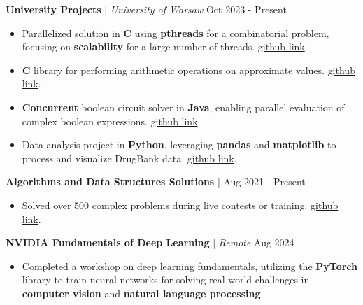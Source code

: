 \documentclass{article}
\renewcommand{\subsection}[3]{
    \noindent\textbf{#1} | \emph{#2} \hfill #3
}
\begin{document}
    \subsection{University Projects}{University of Warsaw}{Oct 2023 - Present}
    \begin{itemize}
        \item Parallelized solution in \textbf{C} using \textbf{pthreads} for a combinatorial problem, focusing on \textbf{scalability} for a large number of threads. \href{https://github.com/mrolbiecki/university-projects/tree/main/concurrent-programming/parallel-combinatorics}{github link}.
        \item \textbf{C} library for performing arithmetic operations on approximate values. \href{https://github.com/mrolbiecki/university-projects/tree/main/introductory-programming/arithmetic-of-approximate-values}{github link}.
        \item \textbf{Concurrent} boolean circuit solver in \textbf{Java}, enabling parallel evaluation of complex boolean expressions. \href{https://github.com/mrolbiecki/university-projects/tree/main/concurrent-programming/circuit-solver}{github link}.
        \item Data analysis project in \textbf{Python}, leveraging \textbf{pandas} and \textbf{matplotlib} to process and visualize DrugBank data. \href{https://github.com/mrolbiecki/university-projects/tree/main/python-course/data-analysis}{github link}.
    \end{itemize}
    \vspace{0.5em}

    \subsection{Algorithms and Data Structures Solutions}{}{Aug 2021 - Present}
    \begin{itemize}
        \item Solved over 500 complex problems during live contests or training. \href{https://github.com/mrolbiecki/competitive-programming-solutions}{github link}.
    \end{itemize}
    \vspace{0.5em}
    
    \subsection{NVIDIA Fundamentals of Deep Learning}{Remote}{Aug 2024}
    \begin{itemize}
        \item Completed a workshop on deep learning fundamentals, utilizing the \textbf{PyTorch} library to train neural networks for solving real-world challenges in \textbf{computer vision} and \textbf{natural language processing}.
    \end{itemize}
    
\end{document}
